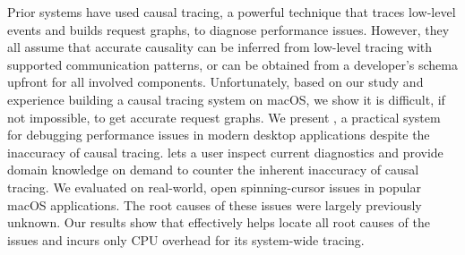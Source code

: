 Prior systems have used causal tracing, a powerful technique that traces low-level
events and builds request graphs, to diagnose performance issues. However, they
all assume that accurate causality can be inferred from low-level tracing with
supported communication patterns, or can be obtained from a developer's schema upfront
for all involved components.  Unfortunately, based on our study and experience
building a causal tracing system on macOS, we show it is difficult, if not
impossible, to get accurate request graphs.
We present \xxx, a practical system for debugging performance issues in modern
desktop applications despite the inaccuracy of causal tracing. \xxx lets a user
inspect current diagnostics and provide domain knowledge on demand to counter
the inherent inaccuracy of causal tracing. We evaluated \xxx on \nbug
real-world, open spinning-cursor issues in popular macOS applications. The
root causes of these issues were largely previously unknown.  Our results
show that \xxx effectively helps locate all root causes of the issues
and incurs only \cpuoverhead CPU overhead for its system-wide tracing.
